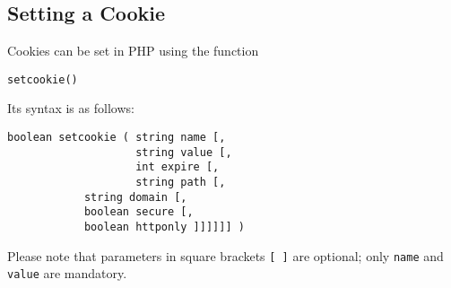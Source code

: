 \documentclass[a4paper, justified, notoc]{tufte-handout} %
\begin{document}
\subsection{Setting a Cookie} %
\label{sub:setting_a_cookie}

Cookies can be set in PHP using the function
\begin{Verbatim}
setcookie()
\end{Verbatim}
Its syntax is as follows:
\begin{Verbatim}
boolean setcookie ( string name [, 
                    string value [, 
                    int expire [, 
                    string path [, 
		    string domain [, 
		    boolean secure [, 
		    boolean httponly ]]]]]] )
\end{Verbatim}
Please note that parameters in square brackets \texttt{[ ]} are optional; only \texttt{name} and \texttt{value} are mandatory. 
\end{document}
